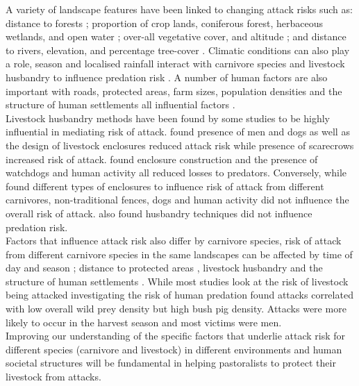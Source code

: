 A variety of landscape features have been linked to changing attack risks such as: distance to forests \cite{DeAzevedo2007}; proportion of crop lands, coniferous forest, herbaceous wetlands, and open water \cite{Treves2015}; over-all vegetative cover, and altitude \cite{Zarco-Gonzalez2013}; and distance to rivers, elevation, and percentage tree-cover \cite{Abade2014h}. Climatic conditions can also play a role, season and localised rainfall interact with carnivore species and livestock husbandry to influence predation risk \cite{Kissui2008,Abade2014h}. A number of human factors are also important with roads, protected areas, farm sizes, population densities and the structure of human settlements all influential factors \cite{Treves2015,Zarco-Gonzalez2012,Holmern2007a}.\\

Livestock husbandry methods have been found by some studies to be highly influential in mediating risk of attack. \citet{Woodroffe2007} found presence of men and dogs as well as the design of livestock enclosures reduced attack risk while presence of scarecrows increased risk of attack. \citet{Ogada2003} found enclosure construction and the presence of watchdogs and human activity all reduced losses to predators. Conversely, while \citet{Kolowski2006} found different types of enclosures to influence risk of attack from different carnivores, non-traditional fences, dogs and human activity did not influence the overall risk of attack. \citet{Abade2014h} also found husbandry techniques did not influence predation risk.\\

Factors that influence attack risk also differ by carnivore species, risk of attack from different carnivore species in the same landscapes can be affected by time of day and season \cite{Kissui2008}; distance to protected areas \cite{Holmern2007a}, livestock husbandry \cite{Woodroffe2007,Kolowski2006} and the structure of human settlements \cite{Kolowski2006}. While most studies look at the risk of livestock being attacked \citet{Packer2005} investigating the risk of human predation found attacks correlated with low overall wild prey density but high bush pig density. Attacks were more likely to occur in the harvest season and most victims were men.\\

Improving our understanding of the specific factors that underlie attack risk for different species (carnivore and livestock) in different environments and human societal structures will be fundamental in helping pastoralists to protect their livestock from attacks.\\

